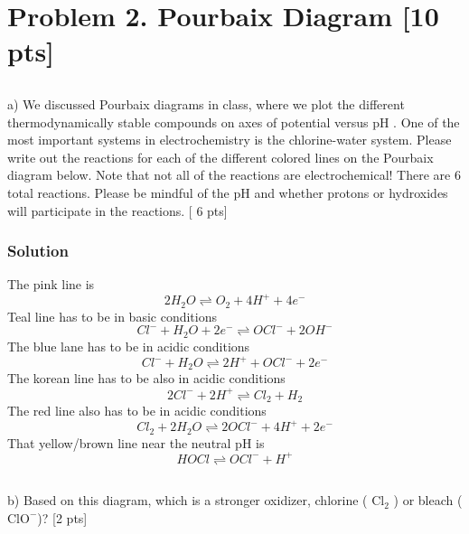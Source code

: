 \documentclass[12pt]{article}
\begin{document}
\section{Problem 2. Pourbaix Diagram [10 pts]}
\subsection{}
a) We discussed Pourbaix diagrams in class, where we plot the different thermodynamically stable compounds on axes of potential versus pH . One of the most important systems in electrochemistry is the chlorine-water system. Please write out the reactions for each of the different colored lines on the Pourbaix diagram below. Note that not all of the reactions are electrochemical! There are 6 total reactions. Please be mindful of the pH and whether protons or hydroxides will participate in the reactions. [ 6 pts]\\[0pt]
\subsubsection{Solution}
The pink line is
\begin{equation}
    2H_2O \rightleftharpoons O_2 + 4H^+ + 4e^-
\end{equation}
Teal line has to be in basic conditions
\begin{equation}
    Cl^- + H_2O + 2e^- \rightleftharpoons OCl^- + 2OH^- 
\end{equation}
The blue lane has to be in acidic conditions
\begin{equation}
    Cl^- +H_2O \rightleftharpoons  2H^+ +OCl^- + 2e^-
\end{equation}
The korean line has to be also in acidic conditions
\begin{equation}
    2Cl^- +2H^+ \rightleftharpoons Cl_2 + H_2
\end{equation}
The red line also has to be in acidic conditions
\begin{equation}
    Cl_2 + 2H_2O \rightleftharpoons 2OCl^- + 4H^+ + 2e^-
\end{equation}
That yellow/brown line near the neutral pH is 
\begin{equation}
    HOCl \rightleftharpoons OCl^- + H^+
\end{equation}
\subsection{}
b) Based on this diagram, which is a stronger oxidizer, chlorine ( $\mathrm{Cl}_{2}$ ) or bleach ( $\mathrm{ClO}^{-}$)? [2 pts]\\[0pt]
\end{document}
